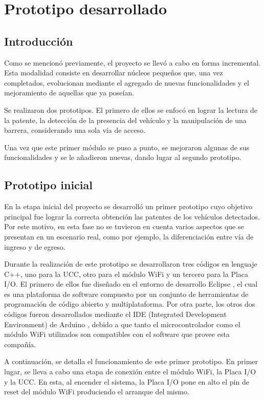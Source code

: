 \chapter{Prototipo desarrollado}  \label{cap:prototipo1v2}

\section{Introducción}\label{sec:introProto1}

Como se mencionó previamente, el proyecto se llevó a cabo en forma incremental. Esta modalidad consiste en desarrollar núcleos pequeños que, una vez completados, evolucionan mediante el agregado de nuevas funcionalidades y el mejoramiento de aquellas que ya poseían.

Se realizaron dos prototipos. El primero de ellos se enfocó en lograr la lectura de la patente, la detección de la presencia del vehículo y la manipulación de una barrera, considerando una sola vía de acceso.

Una vez que este primer módulo se puso a punto, se mejoraron algunas de sus funcionalidades y se le añadieron nuevas, dando lugar al segundo prototipo. 


\section{Prototipo inicial}

En la etapa inicial del proyecto se desarrolló un primer prototipo cuyo objetivo principal fue lograr la correcta obtención las patentes de los vehículos detectados. Por este motivo, en esta fase no se tuvieron en cuenta varios aspectos que se presentan en un escenario real, como por ejemplo, la diferenciación entre vía de ingreso y de egreso.

Durante la realización de este prototipo se desarrollaron tres códigos en lenguaje C++, uno para la UCC, otro para el módulo WiFi y un tercero para la Placa I/O. El primero de ellos fue diseñado en el entorno de desarrollo Eclipse \cite{eclipse}, el cual es una plataforma de software compuesto por un conjunto de herramientas de programación de código abierto y multiplataforma. Por otra parte, los otros dos códigos fueron desarrollados mediante el IDE (Integrated Development Environment) de Arduino \cite{arduinoide}, debido a que tanto el microcontrolador como el módulo WiFi utilizados son compatibles con el software que provee esta compañía.

A continuación, se detalla el funcionamiento de este primer prototipo.
En primer lugar, se lleva a cabo una etapa de conexión entre el módulo WiFi, la Placa I/O y la UCC. En esta, al encender el sistema, la Placa I/O pone en alto el pin de reset del módulo WiFi produciendo el arranque del mismo.

